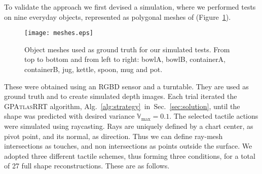 
To validate the approach we first devised a simulation, where we performed tests on nine everyday objects, represented as polygonal meshes of (Figure~\ref{fig:meshes}).
\begin{figure}[t]
    \centering
    \texttt{[image: meshes.eps]}
    \caption{Object meshes used as ground truth for our simulated tests. From top to bottom and from left to right: bowlA, bowlB, containerA, containerB, jug, kettle, spoon, mug and pot.}
    \label{fig:meshes}
\end{figure}
These were obtained using an RGBD sensor and a turntable. They are used as ground truth and to create simulated depth images. Each trial iterated the \textsc{GPAtlasRRT} algorithm, Alg.~\ref{alg:strategy}~in~Sec.~\ref{sec:solution},
until the shape was predicted with desired variance $\mathbb{V}_{\max} = 0.1$.
The selected tactile actions were simulated using  raycasting. Rays are uniquely defined by a chart center, as pivot point, and its normal, as direction.
Thus we can define ray-mesh intersections as touches, and non intersections as points outside the surface. We adopted three different tactile schemes, thus forming three conditions, for a total of 27 full shape reconstructions. These are as follows.

